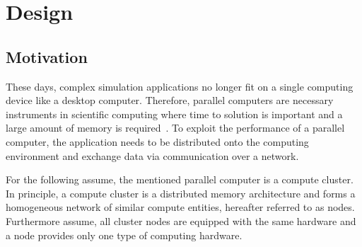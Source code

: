 \chapter{Design}
\label{sec:design}



\section{Motivation}
\label{sec:motivation}

These days, complex simulation applications no longer fit on a single
computing device like a desktop computer. Therefore, parallel
computers are necessary instruments in scientific computing where time
to solution is important and a large amount of memory is required~\cite{ref:hpcc1}.  To
exploit the performance of a parallel computer, the application needs
to be distributed onto the computing environment and exchange data via
communication over a network.

For the following assume, the mentioned
parallel computer is a compute cluster. In principle, a compute
cluster is a distributed memory architecture and forms a homogeneous
network of similar compute entities, hereafter referred to as nodes.
Furthermore assume, all cluster nodes are equipped with the same
hardware and a node provides only one type of computing hardware.

